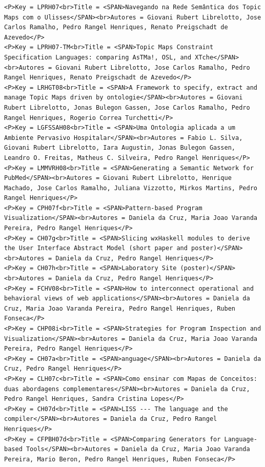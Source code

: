\documentclass[11pt,a4paper]{report}
\begin{document}
\begin{appendices}
\begin{lstlisting}
<P>Key = LPRH07<br>Title = <SPAN>Navegando na Rede Semântica dos Topic Maps com o Ulisses</SPAN><br>Autores = Giovani Rubert Librelotto, Jose Carlos Ramalho, Pedro Rangel Henriques, Renato Preigschadt de Azevedo</P>
<P>Key = LPRH07-TM<br>Title = <SPAN>Topic Maps Constraint Specification Languages: comparing AsTMa!, OSL, and XTche</SPAN><br>Autores = Giovani Rubert Librelotto, Jose Carlos Ramalho, Pedro Rangel Henriques, Renato Preigschadt de Azevedo</P>
<P>Key = LRHGT08<br>Title = <SPAN>A Framework to specify, extract and manage Topic Maps driven by ontologie</SPAN><br>Autores = Giovani Rubert Librelotto, Jonas Bulegon Gassen, Jose Carlos Ramalho, Pedro Rangel Henriques, Rogerio Correa Turchetti</P>
<P>Key = LGFSSAH08<br>Title = <SPAN>Uma Ontologia aplicada a um Ambiente Pervasivo Hospitalar</SPAN><br>Autores = Fabio L. Silva, Giovani Rubert Librelotto, Iara Augustin, Jonas Bulegon Gassen, Leandro O. Freitas, Matheus C. Silveira, Pedro Rangel Henriques</P>
<P>Key = LMMVRH08<br>Title = <SPAN>Generating a Semantic Network for PubMed</SPAN><br>Autores = Giovani Rubert Librelotto, Henrique Machado, Jose Carlos Ramalho, Juliana Vizzotto, Mirkos Martins, Pedro Rangel Henriques</P>
<P>Key = CPH07f<br>Title = <SPAN>Pattern-based Program Visualization</SPAN><br>Autores = Daniela da Cruz, Maria Joao Varanda Pereira, Pedro Rangel Henriques</P>
<P>Key = CH07g<br>Title = <SPAN>Slicing wxHaskell modules to derive the User Interface Abstract Model (short paper and poster)</SPAN><br>Autores = Daniela da Cruz, Pedro Rangel Henriques</P>
<P>Key = CH07h<br>Title = <SPAN>Laboratory Site (poster)</SPAN><br>Autores = Daniela da Cruz, Pedro Rangel Henriques</P>
<P>Key = FCHV08<br>Title = <SPAN>How to interconnect operational and behavioral views of web applications</SPAN><br>Autores = Daniela da Cruz, Maria Joao Varanda Pereira, Pedro Rangel Henriques, Ruben Fonseca</P>
<P>Key = CHP08i<br>Title = <SPAN>Strategies for Program Inspection and Visualization</SPAN><br>Autores = Daniela da Cruz, Maria Joao Varanda Pereira, Pedro Rangel Henriques</P>
<P>Key = CH07a<br>Title = <SPAN>anguage</SPAN><br>Autores = Daniela da Cruz, Pedro Rangel Henriques</P>
<P>Key = CLH07c<br>Title = <SPAN>Como ensinar com Mapas de Conceitos: duas abordagens complementares</SPAN><br>Autores = Daniela da Cruz, Pedro Rangel Henriques, Sandra Cristina Lopes</P>
<P>Key = CH07d<br>Title = <SPAN>LISS --- The language and the compiler</SPAN><br>Autores = Daniela da Cruz, Pedro Rangel Henriques</P>
<P>Key = CFPBH07d<br>Title = <SPAN>Comparing Generators for Language-based Tools</SPAN><br>Autores = Daniela da Cruz, Maria Joao Varanda Pereira, Mario Beron, Pedro Rangel Henriques, Ruben Fonseca</P>

\end{lstlisting}
\end{appendices}
\end{document}
